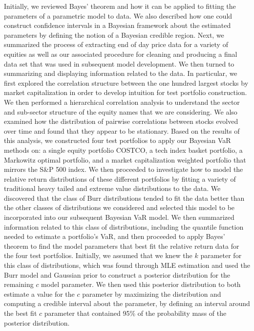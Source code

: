 \documentclass{amsart}
\begin{document}
Initially, we reviewed Bayes' theorem and how it can be applied to fitting the 
parameters of a parametric model to data.  We also described how one could construct 
confidence intervals in a Bayesian framework about the estimated parameters by defining 
the notion of a Bayesian credible region.  Next, we summarized the process of extracting 
end of day price data for a variety of equities as well as our associated procedure for  
cleaning and producing a final data set that was used in subsequent model 
development.  We then turned to summarizing and displaying information related to the 
data.  In particular, we first explored the correlation structure between 
the one hundred largest stocks by market capitalization in order to develop intuition for 
test portfolio construction.  We then performed a hierarchical correlation analysis 
to understand the sector and sub-sector structure of the equity names that we are considering.
We also examined how the distribution of pairwise correlations between stocks evolved over time 
and found that they appear to be stationary.  Based on the results of this analysis, 
we constructed four test portfolios to apply our Bayesian VaR methods on: a single equity 
portfolio COSTCO, a tech index basket portfolio, 
a Markowitz optimal portfolio, and a market capitalization weighted portfolio that mirrors the 
S\&P 500 index.  We then proceeded to investigate how to model the relative return distributions of 
these different portfolios by fitting a variety of traditional heavy tailed and extreme 
value distributions to the data. We discovered that the class of Burr distributions 
tended to fit the data better than the other classes of distributions we considered and selected 
this model to be incorporated into our subsequent Bayesian VaR model.  We then 
summarized information related to this class of distributions, including the quantile function 
needed to estimate a portfolio's VaR, and then proceeded to apply Bayes' theorem to find 
the model parameters that best fit the relative return data for the four test portfolios. 
Initially, we assumed that we knew the $k$ parameter for this class of distributions, which 
was found through MLE estimation and used the Burr model and Gaussian prior to construct 
a posterior distribution for the remaining $c$ model parameter.  We then used this posterior distribution 
to both estimate a value for the $c$ parameter by maximizing the distribution and computing 
a credible interval about the parameter, by defining an interval around the best fit $c$ 
parameter that contained 95\% of the probability mass of the posterior distribution. 
\end{document}
